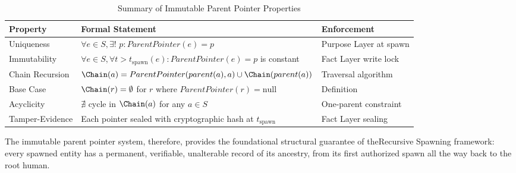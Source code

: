 \begin{table}[H]
\centering
\caption{Summary of Immutable Parent Pointer Properties}
\label{tab:parent-pointer-properties}
\begin{tabular}{@{}L{4cm}L{6cm}L{4cm}@{}}
\toprule
\textbf{Property} & \textbf{Formal Statement} & \textbf{Enforcement} \\
\midrule
Uniqueness & $\forall e \in S, \exists !$ $p : ParentPointer(e) = p$ & Purpose Layer at spawn \\
\midrule
Immutability & $\forall e \in S, \forall t > t_{\text{spawn}}(e) : ParentPointer(e) = p$ is constant & Fact Layer write lock \\
\midrule
Chain Recursion & $\Chain(a) = ParentPointer(parent(a), a) \cup \Chain(parent(a))$ & Traversal algorithm \\
\midrule
Base Case & $\Chain(r) = \emptyset$ for $r$ where $ParentPointer(r) = \text{null}$ & Definition \\
\midrule
Acyclicity & $\nexists$ cycle in $\Chain(a)$ for any $a \in S$ & One-parent constraint \\
\midrule
Tamper-Evidence & Each pointer sealed with cryptographic hash at $t_{\text{spawn}}$ & Fact Layer sealing \\
\bottomrule
\end{tabular}
\end{table}

The immutable parent pointer system, therefore, provides the foundational structural guarantee of theRecursive Spawning framework: every spawned entity has a permanent, verifiable, unalterable record of its ancestry, from its first authorized spawn all the way back to the root human.